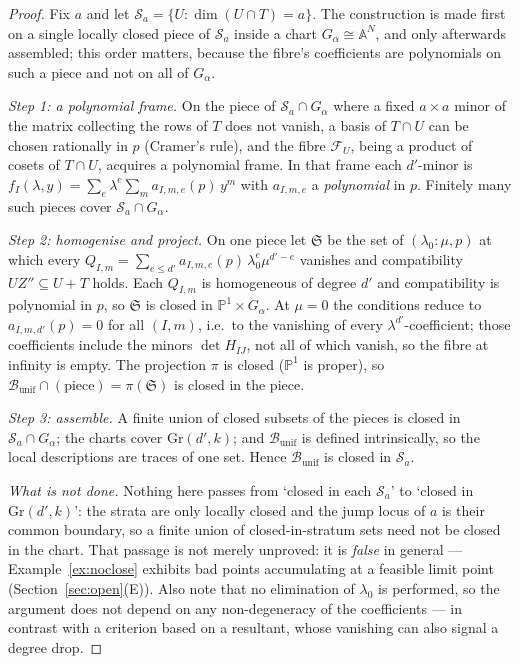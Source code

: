 \documentclass[journal]{IEEEtran}
\theoremstyle{plainn}
\theoremstyle{remark}
\begin{document}
\begin{proof}
Fix $a$ and let $\mathcal S_a=\{U:\dim(U\cap T)=a\}$. The construction is made first on a single
locally closed piece of $\mathcal S_a$ inside a chart $G_\alpha\cong\mathbb A^{N}$, and only afterwards
assembled; this order matters, because the fibre's coefficients are polynomials on such a piece and not
on all of $G_\alpha$.

\emph{Step 1: a polynomial frame.} On the piece of $\mathcal S_a\cap G_\alpha$ where a fixed $a\times a$
minor of the matrix collecting the rows of $T$ does not vanish, a basis of $T\cap U$ can be chosen
rationally in $p$ (Cramer's rule), and the fibre $\mathcal F_U$, being a product of cosets of $T\cap U$,
acquires a polynomial frame. In that frame each $d'$-minor is
$f_I(\lambda,y)=\sum_e\lambda^{e}\sum_m a_{I,m,e}(p)\,y^{m}$ with $a_{I,m,e}$ a \emph{polynomial} in $p$.
Finitely many such pieces cover $\mathcal S_a\cap G_\alpha$.

\emph{Step 2: homogenise and project.} On one piece let $\mathfrak S$ be the set of
$(\lambda_0:\mu,p)$ at which every $Q_{I,m}=\sum_{e\le d'}a_{I,m,e}(p)\,\lambda_0^{e}\mu^{d'-e}$
vanishes and compatibility $UZ''\subseteq U+T$ holds. Each $Q_{I,m}$ is homogeneous of degree $d'$ and
compatibility is polynomial in $p$, so $\mathfrak S$ is closed in $\mathbb P^{1}\times G_\alpha$. At
$\mu=0$ the conditions reduce to $a_{I,m,d'}(p)=0$ for all $(I,m)$, i.e.\ to the vanishing of every
$\lambda^{d'}$-coefficient; those coefficients include the minors $\det H_{IJ}$, not all of which
vanish, so the fibre at infinity is empty. The projection $\pi$ is closed ($\mathbb P^1$ is proper), so
$\mathcal B_{\mathrm{unif}}\cap(\text{piece})=\pi(\mathfrak S)$ is closed in the piece.

\emph{Step 3: assemble.} A finite union of closed subsets of the pieces is closed in
$\mathcal S_a\cap G_\alpha$; the charts cover $\mathrm{Gr}(d',k)$; and $\mathcal B_{\mathrm{unif}}$ is
defined intrinsically, so the local descriptions are traces of one set. Hence
$\mathcal B_{\mathrm{unif}}$ is closed in $\mathcal S_a$.

\emph{What is not done.} Nothing here passes from `closed in each $\mathcal S_a$' to `closed in
$\mathrm{Gr}(d',k)$': the strata are only locally closed and the jump locus of $a$ is their common
boundary, so a finite union of closed-in-stratum sets need not be closed in the chart. That passage is
not merely unproved: it is \emph{false} in general --- Example~\ref{ex:noclose} exhibits bad points
accumulating at a feasible limit point (Section~\ref{sec:open}(E)). Also note that no elimination of $\lambda_0$ is performed, so the
argument does not depend on any non-degeneracy of the coefficients --- in contrast with a criterion based
on a resultant, whose vanishing can also signal a degree drop.
\end{proof}
\end{document}
